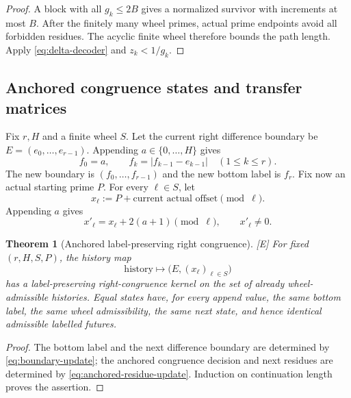 \documentclass[11pt]{article}
\newtheorem{theorem}{Theorem}[section]
\theoremstyle{definition}
\theoremstyle{remark}
\newcommand{\status}[1]{\textnormal{\textcolor{accent}{\footnotesize[#1]}}}
\begin{document}
\begin{proof}
A block with all $g_k\le2B$ gives a normalized survivor with increments at most $B$.
After the finitely many wheel primes, actual prime endpoints avoid all forbidden residues.
The acyclic finite wheel therefore bounds the path length.  Apply
\eqref{eq:delta-decoder} and $z_k<1/g_k$.
\end{proof}

\subsection{Anchored congruence states and transfer matrices}

Fix $r,H$ and a finite wheel $S$.  Let the current right difference boundary be
$E=(e_0,\ldots,e_{r-1})$.  Appending $a\in\{0,\ldots,H\}$ gives
\begin{equation}\label{eq:boundary-update}
 f_0=a,\qquad f_k=|f_{k-1}-e_{k-1}|\quad(1\le k\le r).
\end{equation}
The new boundary is $(f_0,\ldots,f_{r-1})$ and the new bottom label is $f_r$.
Fix now an actual starting prime $P$.  For every $\ell\in S$, let
\begin{equation}\label{eq:anchored-residue-state}
 x_\ell:=P+\text{current actual offset}\pmod\ell.
\end{equation}
Appending $a$ gives
\begin{equation}\label{eq:anchored-residue-update}
 x'_\ell=x_\ell+2(a+1)\pmod\ell,
 \qquad x'_\ell\ne0.
\end{equation}

\begin{theorem}[Anchored label-preserving right congruence]
\label{thm:bisimulation}
\status{E}
For fixed $(r,H,S,P)$, the history map
\[
 \text{history}\longmapsto\bigl(E,(x_\ell)_{\ell\in S}\bigr)
\]
has a label-preserving right-congruence kernel on the set of already wheel-admissible
histories.  Equal states have, for every append value, the same bottom label, the same
wheel admissibility, the same next state, and hence identical admissible labelled futures.
\end{theorem}

\begin{proof}
The bottom label and the next difference boundary are determined by
\eqref{eq:boundary-update}; the anchored congruence decision and next residues are
determined by \eqref{eq:anchored-residue-update}.  Induction on continuation length
proves the assertion.
\end{proof}
\end{document}
